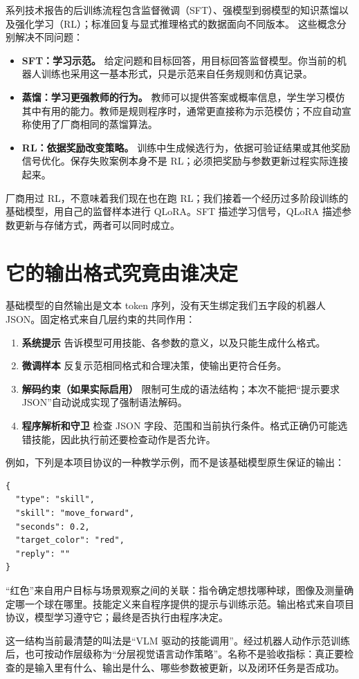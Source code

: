 系列技术报告的后训练流程包含监督微调（SFT）、强模型到弱模型的知识蒸馏以及强化学习（RL）；标准回复与显式推理格式的数据面向不同版本。\cite{qwen-report} 这些概念分别解决不同问题：

\begin{itemize}
\item \textbf{SFT：学习示范。} 给定问题和目标回答，用目标回答监督模型。你当前的机器人训练也采用这一基本形式，只是示范来自任务规则和仿真记录。
\item \textbf{蒸馏：学习更强教师的行为。} 教师可以提供答案或概率信息，学生学习模仿其中有用的能力。教师是规则程序时，通常更直接称为示范模仿；不应自动宣称使用了厂商相同的蒸馏算法。
\item \textbf{RL：依据奖励改变策略。} 训练中生成候选行为，依据可验证结果或其他奖励信号优化。保存失败案例本身不是 RL；必须把奖励与参数更新过程实际连接起来。
\end{itemize}

厂商用过 RL，不意味着我们现在也在跑 RL；我们接着一个经历过多阶段训练的基础模型，用自己的监督样本进行 QLoRA。SFT 描述学习信号，QLoRA 描述参数更新与存储方式，两者可以同时成立。

\section{它的输出格式究竟由谁决定}

基础模型的自然输出是文本 token 序列，没有天生绑定我们五字段的机器人 JSON。固定格式来自几层约束的共同作用：

\begin{enumerate}
\item \textbf{系统提示} 告诉模型可用技能、各参数的意义，以及只能生成什么格式。
\item \textbf{微调样本} 反复示范相同格式和合理决策，使输出更符合任务。
\item \textbf{解码约束（如果实际启用）} 限制可生成的语法结构；本次不能把“提示要求 JSON”自动说成实现了强制语法解码。
\item \textbf{程序解析和守卫} 检查 JSON 字段、范围和当前执行条件。格式正确仍可能选错技能，因此执行前还要检查动作是否允许。
\end{enumerate}

例如，下列是本项目协议的一种教学示例，而不是该基础模型原生保证的输出：

\begin{Verbatim}[breaklines=true,fontsize=\small]
{
  "type": "skill",
  "skill": "move_forward",
  "seconds": 0.2,
  "target_color": "red",
  "reply": ""
}
\end{Verbatim}

“红色”来自用户目标与场景观察之间的关联：指令确定想找哪种球，图像及测量确定哪一个球在哪里。技能定义来自程序提供的提示与训练示范。输出格式来自项目协议，模型学习遵守它；最终是否执行由程序决定。

这一结构当前最清楚的叫法是“VLM 驱动的技能调用”。经过机器人动作示范训练后，也可按动作层级称为“分层视觉语言动作策略”。名称不是验收指标：真正要检查的是输入里有什么、输出是什么、哪些参数被更新，以及闭环任务是否成功。
